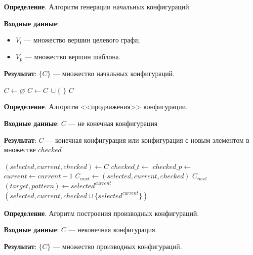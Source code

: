 \textbf{Определение}. Алгоритм генерации начальных конфигураций:

\textbf{Входные данные}:
\begin{itemize}
\item $V_{t}$ --- множество вершин целевого графа;
\item $V_{p}$ --- множество вершин шаблона.
\end{itemize}

\textbf{Результат}: $\{ C \}$ --- множество начальных конфигураций.

\begin{algorithmic}
    \State $C \gets \varnothing$
            \State $C \gets C \ \cup \{$  $\}$
        \EndFor
    \EndFor
    \State \Return $C$
\EndFunction
\end{algorithmic}

\textbf{Определение}. Алгоритм <<продвижения>> конфигурации.

\textbf{Входные данные}: $C$ --- не конечная конфигурация

\textbf{Результат}: $C$ --- конечная конфигурация или конфигурация с новым
элементом в множестве $checked$

\begin{algorithmic}
    \State $(selected, current, checked) \gets C$
    \State $checked\_t \gets$ 
    \State $checked\_p \gets$ 
        \State $current \gets current + 1$
        \State $C_{next} \gets (selected, current, checked)$
            \State \Return $C_{next}$
        \EndIf
        \State $(target, pattern) \gets selected^{current}$
            \State \Return $(selected, current, checked \cup \{ selected^{current} \})$
        \EndIf
    \EndWhile
\EndFunction
\end{algorithmic}

\textbf{Определение}. Агоритм построения производных конфигураций.

\textbf{Входные данные}: $C$ --- неконечная конфигурация.

\textbf{Результат}: $\{ C \}$ --- множество производных конфигураций.

